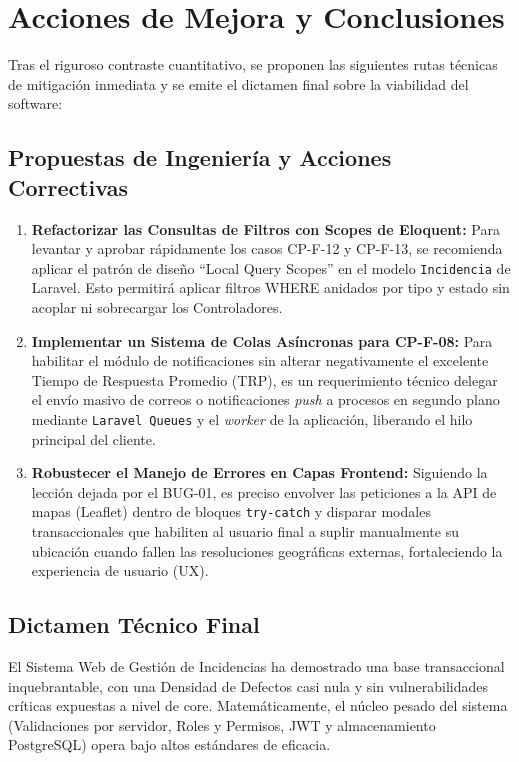 \section{Acciones de Mejora y Conclusiones}
\label{sec:acciones_mejora}

Tras el riguroso contraste cuantitativo, se proponen las siguientes rutas técnicas de mitigación inmediata y se emite el dictamen final sobre la viabilidad del software:

\subsection{Propuestas de Ingeniería y Acciones Correctivas}
\begin{enumerate}
    \item \textbf{Refactorizar las Consultas de Filtros con Scopes de Eloquent:} Para levantar y aprobar rápidamente los casos CP-F-12 y CP-F-13, se recomienda aplicar el patrón de diseño ``Local Query Scopes'' en el modelo \texttt{Incidencia} de Laravel. Esto permitirá aplicar filtros WHERE anidados por tipo y estado sin acoplar ni sobrecargar los Controladores.
    \item \textbf{Implementar un Sistema de Colas Asíncronas para CP-F-08:} Para habilitar el módulo de notificaciones sin alterar negativamente el excelente Tiempo de Respuesta Promedio (TRP), es un requerimiento técnico delegar el envío masivo de correos o notificaciones \textit{push} a procesos en segundo plano mediante \texttt{Laravel Queues} y el \textit{worker} de la aplicación, liberando el hilo principal del cliente.
    \item \textbf{Robustecer el Manejo de Errores en Capas Frontend:} Siguiendo la lección dejada por el BUG-01, es preciso envolver las peticiones a la API de mapas (Leaflet) dentro de bloques \texttt{try-catch} y disparar modales transaccionales que habiliten al usuario final a suplir manualmente su ubicación cuando fallen las resoluciones geográficas externas, fortaleciendo la experiencia de usuario (UX).
\end{enumerate}

\subsection{Dictamen Técnico Final}
El Sistema Web de Gestión de Incidencias ha demostrado una base transaccional inquebrantable, con una Densidad de Defectos casi nula y sin vulnerabilidades críticas expuestas a nivel de core. Matemáticamente, el núcleo pesado del sistema (Validaciones por servidor, Roles y Permisos, JWT y almacenamiento PostgreSQL) opera bajo altos estándares de eficacia.

